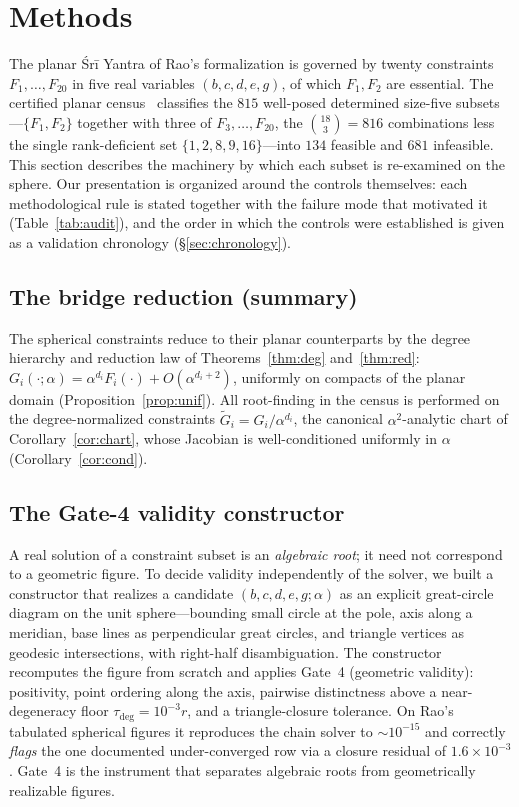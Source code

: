 \documentclass[pdflatex,sn-mathphys-num]{sn-jnl}
\theoremstyle{thmstyleone}%
\theoremstyle{thmstyletwo}%
\theoremstyle{thmstylethree}%
\begin{document}
\section{Methods}
\label{sec:methods}

The planar Śrī Yantra of Rao's formalization is governed by twenty constraints $F_1,\dots,F_{20}$ in five real variables $(b,c,d,e,g)$, of which $F_1,F_2$ are essential. The certified planar census~\cite{plane-census} classifies the $815$ well-posed determined size-five subsets---$\{F_1,F_2\}$ together with three of $F_3,\dots,F_{20}$, the $\binom{18}{3}=816$ combinations less the single rank-deficient set $\{1,2,8,9,16\}$---into $134$ feasible and $681$ infeasible. This section describes the machinery by which each subset is re-examined on the sphere. Our presentation is organized around the controls themselves: each methodological rule is stated together with the failure mode that motivated it (Table~\ref{tab:audit}), and the order in which the controls were established is given as a validation chronology (\S\ref{sec:chronology}).

\subsection{The bridge reduction (summary)}
\label{sec:bridge}
The spherical constraints reduce to their planar counterparts by the degree
hierarchy and reduction law of Theorems~\ref{thm:deg} and~\ref{thm:red}:
$G_i(\cdot;\alpha)=\alpha^{d_i}F_i(\cdot)+O(\alpha^{d_i+2})$, uniformly on compacts of the planar domain (Proposition~\ref{prop:unif}). All root-finding in the census is performed on the degree-normalized constraints $\widetilde G_i=G_i/\alpha^{d_i}$, the canonical $\alpha^2$-analytic chart of Corollary~\ref{cor:chart}, whose Jacobian is well-conditioned uniformly in $\alpha$ (Corollary~\ref{cor:cond}).

\subsection{The Gate-4 validity constructor}
\label{sec:gate4}

A real solution of a constraint subset is an \emph{algebraic root}; it need not correspond to a geometric figure. To decide validity independently of the
solver, we built a constructor that realizes a candidate $(b,c,d,e,g;\alpha)$ as an explicit great-circle diagram on the unit sphere---bounding small circle at the pole, axis along a meridian, base lines as perpendicular great circles, and triangle vertices as geodesic intersections, with right-half disambiguation. The constructor recomputes the figure from scratch and applies Gate~4 (geometric validity): positivity, point ordering along the axis, pairwise distinctness above a near-degeneracy floor $\tau_{\deg}=10^{-3}r$, and a triangle-closure tolerance.
On Rao's tabulated spherical figures it reproduces the chain solver to
$\sim\!10^{-15}$ and correctly \emph{flags} the one documented under-converged row via a closure residual of $1.6\times10^{-3}$. Gate~4 is the instrument that separates algebraic roots from geometrically realizable figures.
\end{document}
